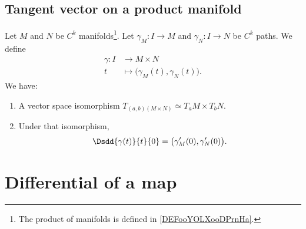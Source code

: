 \subsection{Tangent vector on a product manifold}

\begin{lemma}       \label{LEMooTONEooFiysTA}
	Let \( M\) and \( N\) be \( C^k\) manifolds\footnote{The product of manifolds is defined in \ref{DEFooYOLXooDPrnHa}.}. Let \( \gamma_M\colon I\to M\) and \( \gamma_N\colon I\to N\) be \( C^k\) paths. We define
	\begin{equation}
		\begin{aligned}
			\gamma\colon I & \to M\times N                                \\
			t              & \mapsto \big( \gamma_M(t),\gamma_N(t) \big).
		\end{aligned}
	\end{equation}
	We have:
	\begin{enumerate}
		\item
		      A vector space isomorphism \( T_{(a,b)(M\times N)}\simeq T_aM\times T_bN\).
		\item
		      Under that isomorphism,
		      \begin{equation}
			      \Dsdd{ \gamma(t) }{t}{0}=\big( \gamma_M'(0),\gamma_N'(0) \big).
		      \end{equation}
	\end{enumerate}
\end{lemma}

\section{Differential of a map}

